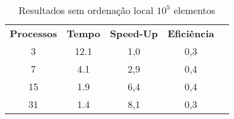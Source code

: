 \begin{table}[h!]
\centering
\caption{Resultados sem ordenação local $10^5$ elementos}
\label{table:parallel-100k}
\begin{tabular}{ccccc}
 \textbf{Processos} & \textbf{Tempo} & \textbf{Speed-Up} & \textbf{Eficiência} \\
 3                & 12.1           & 1,0               & 0,3                 \\
 7                & 4.1            & 2,9               & 0,4                 \\
 15               & 1.9            & 6,4               & 0,4                 \\
 31               & 1.4            & 8,1               & 0,3                
\end{tabular}
\end{table}

